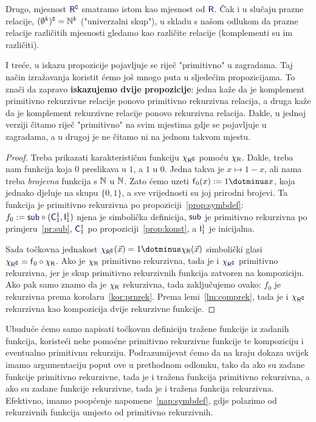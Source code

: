 Drugo, mjesnost  $\f R\kompl$ smatramo istom kao mjesnost od $\f R$. Čak i u slučaju prazne relacije, $(\emptyset^k)\sp{{\scriptscriptstyle\complement}}={\mathbb N}^k$ ("univerzalni skup"), u skladu s našom odlukom da prazne relacije različitih mjesnosti gledamo kao različite relacije (komplementi su im različiti).

I treće, u iskazu propozicije pojavljuje se riječ "primitivno" u zagradama. Taj način izražavanja koristit ćemo još mnogo puta u sljedećim propozicijama. To znači da zapravo \textbf{iskazujemo dvije propozicije}: jedna kaže da je komplement primitivno rekurzivne relacije ponovo primitivno rekurzivna relacija, a druga kaže da je komplement rekurzivne relacije ponovo rekurzivna relacija. Dakle, u jednoj verziji čitamo riječ "primitivno" na svim mjestima gdje se pojavljuje u zagradama, a u drugoj je ne čitamo ni na jednom takvom mjestu.

\begin{proof}
Treba prikazati karakterističnu funkciju $\chi_{\f R\kompl}$ pomoću $\chi_{\f R}$. Dakle, treba nam funkcija koja $0$ preslikava u $1$, a $1$ u $0$. Jedna takva je $x\mapsto1-x$, ali nama treba \emph{brojevna} funkcija s ${\mathbb N}$ u ${\mathbb N}$. Zato ćemo uzeti $\f f_0(x):=1\dotminus x$, koja jednako djeluje na skupu $\{0,1\}$, a sve vrijednosti su joj prirodni brojevi. Ta funkcija je primitivno rekurzivna po propoziciji~\ref{prop:symbdef}: $f_0:=\f{sub}\circ(\f C_1^1,\f I_1^1)$ njena je simbolička definicija, $\f{sub}$ je primitivno rekurzivna po primjeru~\ref{pr:sub}, $\f C_1^1$ po propoziciji~\ref{prop:konst}, a $\f I_1^1$ je inicijalna.

Sada točkovna jednakost $\chi_{\f R\kompl}(\vec x)=1\dotminus\chi_{\f R}(\vec x)$ simbolički glasi $\chi_{\f R\kompl}=\f f_0\circ\chi_{\f R}$. Ako je $\chi_{\f R}$ primitivno rekurzivna, tada je i $\chi_{\f R\kompl}$ primitivno rekurzivna, jer je skup primitivno rekurzivnih funkcija zatvoren na kompoziciju.
Ako pak samo znamo da je $\chi_{\f R}$ rekurzivna, tada zaključujemo ovako: $f_0$ je rekurzivna prema korolaru~\ref{kor:prnrek}. Prema lemi~\ref{lm:comprek}, tada je i $\chi_{\f R\kompl}$ rekurzivna kao kompozicija dvije rekurzivne funkcije.
\end{proof}

Ubuduće ćemo samo napisati točkovnu definiciju tražene funkcije iz zadanih funkcija, koristeći neke pomoćne primitivno rekurzivne funkcije te kompoziciju i eventualno primitivnu rekurziju. Podrazumijevat ćemo da na kraju dokaza uvijek imamo argumentaciju poput ove u prethodnom odlomku, tako da ako su zadane funkcije primitivno rekurzivne, tada je i tražena funkcija primitivno rekurzivna, a ako su zadane funkcije rekurzivne, tada je i tražena funkcija rekurzivna. Efektivno, imamo poopćenje napomene~\ref{nap:symbdef}, gdje polazimo od rekurzivnih funkcija umjesto od primitivno rekurzivnih.

